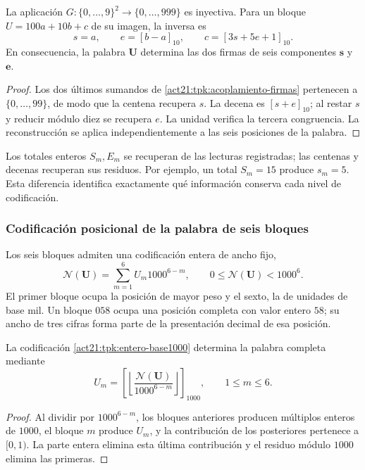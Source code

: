 \begin{proposition}
\label{act21:tpk:recuperacion-firmas}
La aplicación \(G:\{0,\ldots,9\}^2\to\{0,\ldots,999\}\) es inyectiva.
Para un bloque \(U=100a+10b+c\) de su imagen, la inversa es
\[
 s=a,\qquad e=[b-a]_{10},\qquad
 c=[3s+5e+1]_{10}.
\]
En consecuencia, la palabra \(\mathbf U\) determina las dos firmas de
seis componentes \(\mathbf s\) y \(\mathbf e\).
\end{proposition}
\begin{proof}
Los dos últimos sumandos de \eqref{act21:tpk:acoplamiento-firmas} pertenecen a
\(\{0,\ldots,99\}\), de modo que la centena recupera \(s\). La decena
es \([s+e]_{10}\); al restar \(s\) y reducir módulo diez se recupera
\(e\). La unidad verifica la tercera congruencia. La reconstrucción se
aplica independientemente a las seis posiciones de la palabra.
\end{proof}

Los totales enteros \(S_m,E_m\) se recuperan de las lecturas registradas;
las centenas y decenas recuperan sus residuos. Por ejemplo, un total
\(S_m=15\) produce \(s_m=5\). Esta diferencia identifica exactamente
qué información conserva cada nivel de codificación.



\subsubsection{Codificación posicional de la palabra de seis bloques}

Los seis bloques admiten una codificación entera de ancho fijo,
\begin{equation}
 \mathscr N(\mathbf U)=\sum_{m=1}^{6}U_m1000^{6-m},
 \qquad0\leq\mathscr N(\mathbf U)<1000^6.
 \label{act21:tpk:entero-base1000}
\end{equation}
El primer bloque ocupa la posición de mayor peso y el sexto, la de unidades
de base mil. Un bloque \(058\) ocupa una posición completa con valor
entero \(58\); su ancho de tres cifras forma parte de la presentación
decimal de esa posición.

\begin{proposition}
\label{act21:tpk:inversa-base1000}
La codificación \eqref{act21:tpk:entero-base1000} determina la palabra completa
mediante
\[
 U_m=\left[\left\lfloor
 \frac{\mathscr N(\mathbf U)}{1000^{6-m}}\right\rfloor\right]_{1000},
 \qquad1\leq m\leq6.
\]
\end{proposition}
\begin{proof}
Al dividir por \(1000^{6-m}\), los bloques anteriores producen múltiplos
enteros de \(1000\), el bloque \(m\) produce \(U_m\), y la contribución
de los posteriores pertenece a \([0,1)\). La parte entera elimina esta
última contribución y el residuo módulo \(1000\) elimina las primeras.
\end{proof}

